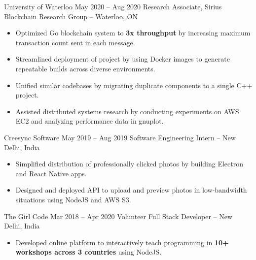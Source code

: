 \documentclass{article}
\begin{document}
\iffalse
Accelerated research in the field of Byzantine fault tolerant distributed computing, by implementing security features (like BLS signature verification), streamlining build and deployment of project using Docker, and reducing technical debt by standardizing use of external dependencies. Conducted performance benchmarks on AWS and analyzed performance data using gnuplot and Python.
\fi
\WorkEntry
{University of Waterloo}
{May 2020 -- Aug 2020}
{Research Associate, Sirius Blockchain Research Group -- Waterloo, ON}
{\begin{itemize} \itemsep -1pt
    \item Optimized Go blockchain system to \textbf{3x throughput} by increasing maximum transaction count sent in each message.
    \item Streamlined deployment of project by using Docker images to generate repeatable builds across diverse environments.
    \item Unified similar codebases by migrating duplicate components to a single  C++ project.
    \item Assisted distributed systems research by conducting experiments on AWS EC2 and analyzing performance data in gnuplot.
    \end{itemize}}
\iffalse
Designed and build native apps for professional photographers to deliver photos to clients, using Electron and React Native, and created API to preview uploaded photos in low-bandwidth situations, using NodeJS and AWS S3. Reduced technical debt in React Native project by combining similar functionality into reusable components.
\fi
\WorkEntry
{Creesync Software}
{May 2019 -- Aug 2019}
{Software Engineering Intern -- New Delhi, India}
{\begin{itemize} \itemsep -1pt
    \item Simplified distribution of professionally clicked photos by building Electron and React Native apps.
    \item Designed and deployed API to upload and preview photos in low-bandwidth situations using NodeJS and AWS S3.
    \end{itemize}}
\WorkEntry
{The Girl Code}
{Mar 2018 -- Apr 2020}
{Volunteer Full Stack Developer -- New Delhi, India}
{\begin{itemize} \itemsep -1pt
	\item Developed online platform to interactively teach programming in \textbf{10+ workshops across 3 countries} using NodeJS.
    \end{itemize}}
\end{document}

